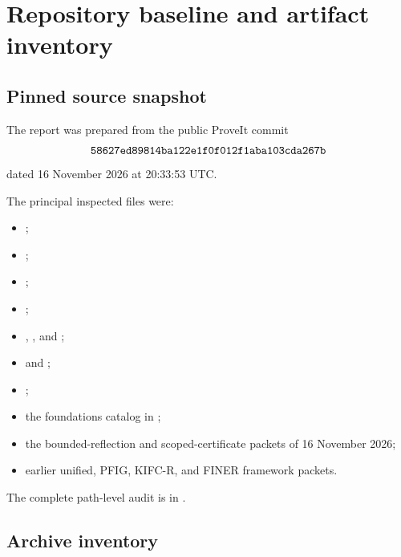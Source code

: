 \section{Repository baseline and artifact inventory}

\subsection{Pinned source snapshot}

The report was prepared from the public ProveIt  commit
\[
\code{58627ed89814ba122e1f0f012f1aba103cda267b}
\]
dated 16 November 2026 at 20:33:53 UTC.

The principal inspected files were:

\begin{itemize}
\item {};
\item {};
\item {};
\item {};
\item {}, , and ;
\item {} and ;
\item {};
\item the foundations catalog in ;
\item the bounded-reflection and scoped-certificate packets of 16 November 2026;
\item earlier unified, PFIG, KIFC-R, and FINER framework packets.
\end{itemize}

The complete path-level audit is in .

\subsection{Archive inventory}

